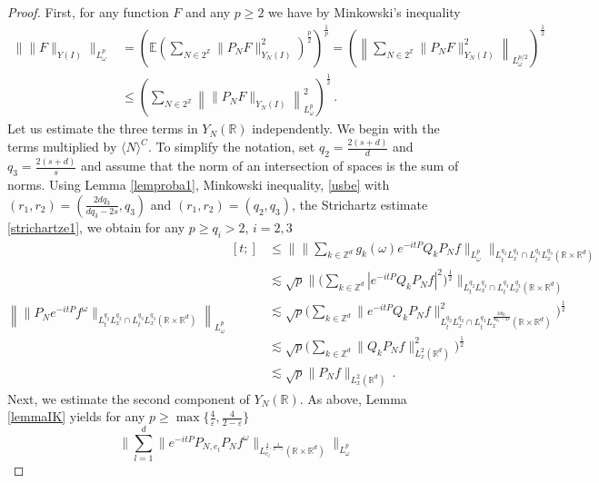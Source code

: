 \documentclass[aihp]{imsart}
\numberwithin{equation}{section}
\theoremstyle{plain}
\theoremstyle{remark}
\newcommand{\R}{\mathbb{R}}
\newcommand{\Z}{\mathbb{Z}}
\begin{document}
\begin{proof}
First, for any function $F$ and any $p \geq 2$ we have by Minkowski's inequality 
\begin{align*}
\|\|F \|_{Y(I)} \|_{L_\omega^p} &=  \left(\mathbb{E}\left(\sum_{N \in 2^\Z} \|P_N F\|_{Y_N(I)}^2 \right)^{\frac{p}{2}}\right)^{\frac{1}{p}} = 
\left( \left\|\sum_{N \in 2^\Z} \|P_N F\|_{Y_N(I)}^2 \right\|_{L_\omega^{p/2 }} \right)^{\frac{1}{2}} \\
&\leq 
\left(\sum_{N \in 2^\Z} \left\| \|P_NF\|_{Y_N(I)} \right\|_{L_\omega^{p }}^2 \right)^{\frac{1}{2}} \,.
\end{align*}
Let us estimate the three terms in $Y_N(\R)$ independently. We begin with the terms multiplied by $\langle N \rangle^C$. To simplify the notation,  set $q_2=\frac{2(s+d)}{d}$ and $q_3=\frac{2(s+d)}{s}$
and assume that the norm of an intersection of spaces is the sum of norms.  Using Lemma \ref{lemproba1},
Minkowski inequality, \eqref{usbe} with $(r_1, r_2) = (\frac{2dq_3 }{dq_3 -2s}, q_3)$ and $(r_1, r_2) = (q_2, q_3)$, the Strichartz estimate \eqref{strichartze1}, we obtain for any $p \geq q_i > 2$, $i = 2, 3$
\begin{equation*}
\left\|\|P_{N}e^{-it P} f^\omega \|_{L_t^{q_2} L_x^{q_3} \cap L_t^{q_3} L_x^{q_3} (\R \times \R^d) }  \right\|_{L_\omega^p}
\begin{aligned}[t;]
&\leq \Big\|  \Big\| \sum_{k \in \Z^d} g_k (\omega) e^{-it P}  Q_k P_N f \Big\|_{L_\omega^p} \Big\|_{L_t^{q_2} L_x^{q_3} \cap L_t^{q_3} L_x^{q_3} (\R \times \R^d) } \\
&\lesssim \sqrt{p} \Big\| \Big( \sum_{k \in \Z^d}  |e^{-it P}  Q_k  P_N f|^2 \Big)^{\frac{1}{2}}  \Big\|_{L_t^{q_2} L_x^{q_3} \cap L_t^{q_3} L_x^{q_3} (\R\times \R^d) } \\
&\lesssim  \sqrt{p} \Big( \sum_{k \in \Z^d} \| e^{-it P}  Q_k P_N f  \|^2_{L_t^{q_2} L_x^{q_2} \cap L_t^{q_3} L_x^{\frac{2dq_3 }{dq_3 -2s}} (\R \times \R^d)}  \Big)^{\frac{1}{2}}\\
&\lesssim   \sqrt{p} \Big( \sum_{k \in \Z^d} \|  Q_k P_N f  \|^2_{L_x^2 (\R^d) } \Big)^{\frac{1}{2}}\\
&\lesssim \sqrt{p} \|P_N f\|_{L_x^2 (\R^d)} \,.
\end{aligned}
\end{equation*}
Next, we estimate the second component of $Y_N (\R)$.  As above, Lemma \ref{lemmaIK} yields for any $p \geq \max\{\frac{4}{\varepsilon}, \frac{4}{2 - \varepsilon}\}$
\begin{equation*}
\bigg\|\sum_{l=1}^d \|e^{-it P} P_{N,e_l} P_N f^\omega \|_{L^{\frac{4}{\varepsilon},\frac{4}{2-\varepsilon}}_{e_l} (\R\times \R^d)} \bigg\|_{L_\omega^p}  

\end{equation*}
\end{proof}
\end{document}
